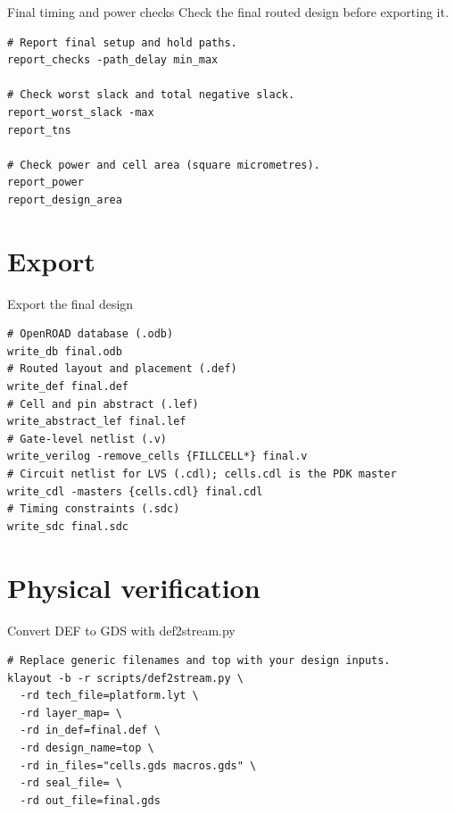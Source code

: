 \begin{frame}[fragile]{Final timing and power checks}
\vspace{3pt}
{\large Check the final routed design before exporting it.}\par\vspace{16pt}
\begin{lstlisting}
# Report final setup and hold paths.
report_checks -path_delay min_max

# Check worst slack and total negative slack.
report_worst_slack -max
report_tns

# Check power and cell area (square micrometres).
report_power
report_design_area
\end{lstlisting}
\end{frame}

\section{Export}

\begin{frame}[fragile]{Export the final design}
\begin{lstlisting}
# OpenROAD database (.odb)
write_db final.odb
# Routed layout and placement (.def)
write_def final.def
# Cell and pin abstract (.lef)
write_abstract_lef final.lef
# Gate-level netlist (.v)
write_verilog -remove_cells {FILLCELL*} final.v
# Circuit netlist for LVS (.cdl); cells.cdl is the PDK master
write_cdl -masters {cells.cdl} final.cdl
# Timing constraints (.sdc)
write_sdc final.sdc
\end{lstlisting}
\end{frame}

\section{Physical verification}

\begin{frame}[fragile]{Convert DEF to GDS with def2stream.py}
\vspace{4pt}
\begin{lstlisting}
# Replace generic filenames and top with your design inputs.
klayout -b -r scripts/def2stream.py \
  -rd tech_file=platform.lyt \
  -rd layer_map= \
  -rd in_def=final.def \
  -rd design_name=top \
  -rd in_files="cells.gds macros.gds" \
  -rd seal_file= \
  -rd out_file=final.gds
\end{lstlisting}
\end{frame}


